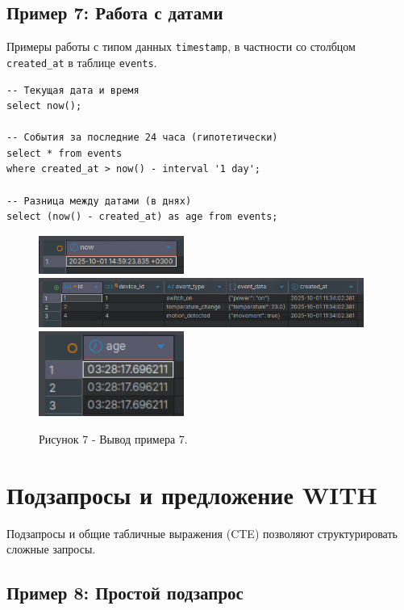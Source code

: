 \documentclass[oneside,a4paper,14pt]{extarticle}
\begin{document}
\subsection*{Пример 7: Работа с датами}

Примеры работы с типом данных \texttt{timestamp}, в частности со столбцом \texttt{created\_at} в таблице \texttt{events}.

\begin{verbatim}
-- Текущая дата и время
select now();

-- События за последние 24 часа (гипотетически)
select * from events 
where created_at > now() - interval '1 day';

-- Разница между датами (в днях)
select (now() - created_at) as age from events;
\end{verbatim}

\begin{figure}[H]
  \centering
  \includegraphics[width=0.425\textwidth]{pics/dates_1.png}\\
  \includegraphics[width=0.95\textwidth]{pics/dates_2.png}\\
  \includegraphics[width=0.425\textwidth]{pics/dates_3.png}
  \caption*{Рисунок 7 - Вывод примера 7.}
\end{figure}

\section*{Подзапросы и предложение WITH}

Подзапросы и общие табличные выражения (CTE) позволяют структурировать сложные запросы.

\subsection*{Пример 8: Простой подзапрос}
\end{document}
